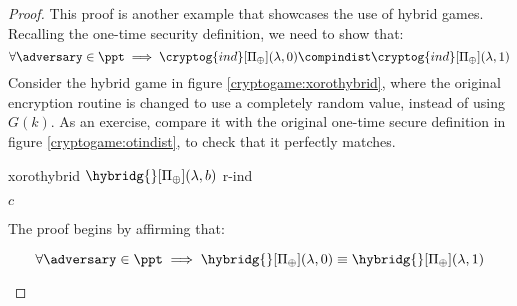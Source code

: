 \begin{proof}
    This proof is another example that showcases the use of hybrid games. Recalling the one-time security definition, we need to show that:
    \[
        \forall \adversary \in \ppt \implies \cryptog{ind}[\Pi_\oplus](\lambda, 0) \compindist \cryptog{ind}[\Pi_\oplus](\lambda, 1)
    \]
    Consider the hybrid game in figure \ref{cryptogame:xorothybrid}, where the original encryption routine is changed to use a completely random value, instead of using $G(k)$\footnotemark. As an exercise, compare it with the original one-time secure definition in figure \ref{cryptogame:otindist}, to check that it perfectly matches.


    \begin{cryptogame}
        {xorothybrid}
        {$\hybridg{}[\Pi_\oplus](\lambda, b)$}
        {r-ind}


        {$c$}{}

        \cseqdelay

        
    \end{cryptogame}

    The proof begins by affirming that:
    \begin{claim}
        \[
            \forall \adversary \in \ppt \implies \hybridg{}[\Pi_\oplus](\lambda, 0) \equiv \hybridg{}[\Pi_\oplus](\lambda, 1)
        \]
    \end{claim}


\end{proof}
